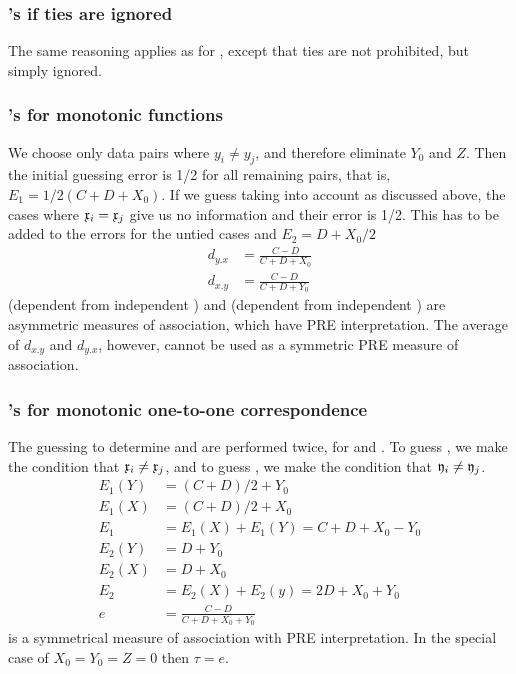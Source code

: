 \begin{refsection}
\subsubsection{'s \skalar{\gamma} if ties are ignored}

The same reasoning applies as for \skalar{\tau}, except that ties are not prohibited, but simply ignored.

\subsubsection{'s  for monotonic functions}

We choose only data pairs where \(y_i \neq y_j \), and therefore eliminate \(Y_0 \) and \(Z \). Then the initial guessing error is 1/2 for all remaining pairs, that is, \(E_1 = 1/2 (C+D+X_0) \). If we guess taking  into account as discussed above, the cases where \(\mathfrak{x}_i = \mathfrak{x}_j \) give us no information and their error is 1/2. This has to be added to the errors for the untied cases and \(E_2 = D + X_0/2 \)
\begin{align}
  d_{y.x} &= \frac{C-D}{C+D+X_0} \\
  d_{x.y} &= \frac{C-D}{C+D+Y_0}
\end{align}
 (dependent  from independent ) and  (dependent  from independent ) are asymmetric measures of association, which have PRE interpretation. The average of \(d_{x.y} \) and \(d_{y.x} \), however, cannot be used as a symmetric PRE measure of association.

\subsubsection{'s  for monotonic one-to-one correspondence}

The guessing to determine  and  are performed twice, for  and . To guess , we make the condition that \(\mathfrak{x}_i \neq \mathfrak{x}_j \), and to guess , we make the condition that \(\mathfrak{y}_i \neq \mathfrak{y}_j \).
\begin{align}
   E_1(Y) &= (C+D)/2 + Y_0 \\
   E_1(X) &= (C+D)/2 + X_0 \\
   E_1    &= E_1(X) + E_1(Y) = C+D+X_0-Y_0\\
   E_2(Y) &= D + Y_0 \\
   E_2(X) &= D + X_0 \\
   E_2    &= E_2(X) + E_2(y) = 2D + X_0 + Y_0 \\
   e      &= \frac{C-D}{C+D+X_0+Y_0}
\end{align}
is a symmetrical measure of association with PRE interpretation. In the special case of \(X_0=Y_0=Z=0 \) then \(\tau = e \).


\end{refsection}
